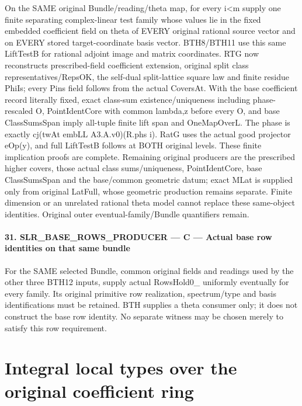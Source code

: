 \documentclass[11pt,a4paper]{article}
\numberwithin{equation}{section}
\theoremstyle{remark}\newtheorem{remark}[theorem]{Remark}
\begin{document}
On the SAME original Bundle/reading/theta map, for every i<m supply one finite separating complex-linear test family whose values lie in the fixed embedded coefficient field on theta of EVERY original rational source vector and on EVERY stored target-coordinate basis vector. BTH8/BTH11 use this same LiftTestB for rational adjoint image and matrix coordinates. RTG now reconstructs prescribed-field coefficient extension, original split class representatives/RepsOK, the self-dual split-lattice square law and finite residue PhiIs; every Pins field follows from the actual CoversAt. With the base coefficient record literally fixed, exact class-sum existence/uniqueness including phase-rescaled O, PointIdentCore with common lambda,z before every O, and base ClassSumsSpan imply all-tuple finite lift span and OneMapOverL. The phase is exactly cj(twAt embLL A3.A.v0)(R.phs i). RatG uses the actual good projector eOp(y), and full LiftTestB follows at BOTH original levels. These finite implication proofs are complete. Remaining original producers are the prescribed higher covers, those actual class sums/uniqueness, PointIdentCore, base ClassSumsSpan and the base/common geometric datum; exact MLat is supplied only from original LatFull, whose geometric production remains separate. Finite dimension or an unrelated rational theta model cannot replace these same-object identities. Original outer eventual-family/Bundle quantifiers remain.



\paragraph{31. SLR\_\allowbreak BASE\_\allowbreak ROWS\_\allowbreak PRODUCER — C — Actual base row identities on that same bundle}

For the SAME selected Bundle, common original fields and readings used by the other three BTH12 inputs, supply actual RowsHold0\_ uniformly eventually for every family. Its original primitive row realization, spectrum/type and basis identifications must be retained. BTH supplies a theta consumer only; it does not construct the base row identity. No separate witness may be chosen merely to satisfy this row requirement.



\clearpage
\section{Integral local types over the original coefficient ring}
\label{sec:integral-type-v43}
\end{document}
